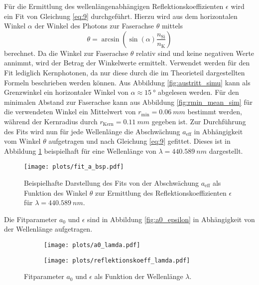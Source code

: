Für die Ermittlung des wellenlängenabhängigen Reflektionskoeffizienten $\epsilon$ wird ein Fit von Gleichung \eqref{eq:9} durchgeführt. Hierzu wird aus dem horizontalen Winkel $\alpha$ der Winkel des Photons zur Faserachse $\theta$ mittels 
\begin{equation}
    \theta = \arcsin \left( \sin(\alpha)\frac{n_\mathrm{Si}}{n_\mathrm{K}}\right)
    \label{eq:theta}
\end{equation}
berechnet. Da die Winkel zur Faserachse $\theta$ relativ sind und keine negativen Werte annimmt, wird der Betrag der Winkelwerte ermittelt. Verwendet werden für den Fit lediglich Kernphotonen, da nur diese durch die im Theorieteil dargestellten Formeln beschrieben werden können. Aus Abbildung \ref{fig:austritt_simu} kann als Grenzwinkel ein horizontaler Winkel von $\alpha \approx \SI{15}{°}$ abgelesen werden.
Für den minimalen Abstand zur Faserachse kann aus Abbildung \ref{fig:rmin_mean_sim} für die verwendeten Winkel ein Mittelwert von $r_\mathrm{min} = \SI{0.06}{mm}$ bestimmt werden, während der Kernradius durch $r_\mathrm{Kern} = \SI{0.11}{mm}$ \cite{anleitung} gegeben ist.
Zur Durchführung des Fits wird nun für jede Wellenlänge die Abschwächung $a_\mathrm{eff}$ in Abhängigkeit vom Winkel $\theta$ aufgetragen und nach Gleichung \eqref{eq:9} gefittet. Dieses ist in Abbildung \ref{fig:fit_a_bsp} beispielhaft für eine Wellenlänge von $\lambda = \SI{440.589}{nm}$ dargestellt.
\begin{figure}
    \centering
    \texttt{[image: plots/fit\_a\_bsp.pdf]}
    \caption{Beispielhafte Darstellung des Fits von der Abschwächung $a_\mathrm{eff}$ als Funktion des Winkel $\theta$ zur Ermittlung des Reflektionskoeffizienten $\epsilon$ für $\lambda = \SI{440.589}{nm}$.}
    \label{fig:fit_a_bsp}
\end{figure}
\FloatBarrier
Die Fitparameter $a_0$ und $\epsilon$ sind in Abbildung \ref{fig:a0_epsilon} in Abhängigkeit von der Wellenlänge aufgetragen.
\begin{figure}
    \begin{subfigure}[c]{0.5\textwidth}    
        \texttt{[image: plots/a0\_lamda.pdf]}
    \end{subfigure}
    \begin{subfigure}[c]{0.5\textwidth}
        \texttt{[image: plots/reflektionskoeff\_lamda.pdf]}
    \end{subfigure}
    \caption{Fitparameter $a_0$ und $\epsilon$ als Funktion der Wellenlänge $\lambda$.}
    \label{fig:a_I0_winkel}
\end{figure}


